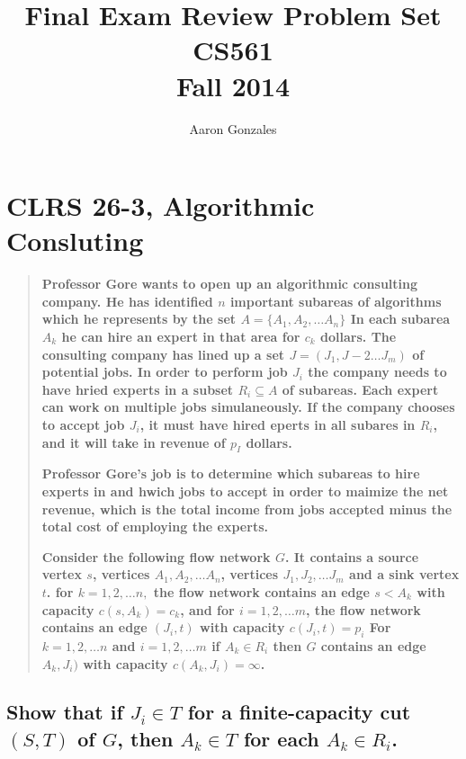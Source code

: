 \documentclass[titlepage]{article}\usepackage[]{graphicx}\usepackage[]{color}
\begin{document}
\title{Final Exam Review Problem Set \\ CS561 \\ Fall 2014}
\author{Aaron Gonzales}
\maketitle


\section{CLRS 26-3, Algorithmic Consluting}
\begin{quote}
  \textbf{Professor Gore wants to open up an algorithmic consulting company.
    He has identified $n$ important subareas of algorithms which he represents
    by the set $A = \{ A_1, A_2,\dots A_n\}$ In each subarea $A_k$ he can hire
    an expert in that area for $c_k$ dollars. The consulting company has lined
    up a set $J = (J_1, J-2 \dots J_m)$ of potential jobs. In order to perform
    job $J_i$ the company needs to have hried experts in a subset $R_i \subseteq A$
    of subareas. Each expert can work on multiple jobs simulaneously. If the
    company chooses to accept job $J_i$, it must have hired eperts in all
  subares in $R_i$, and it will take in revenue of $p_I$ dollars.} 

  \textbf{Professor Gore's job is to determine which subareas to hire experts in and
    hwich jobs to accept in order to maimize the net revenue, which is the
    total income from jobs accepted minus the total cost of employing the
  experts.}

  \textbf{Consider the following flow network $G$. It contains a source vertex $s$,
    vertices $A_1, A_2,\dots A_n$, vertices $J_1, J_2, \dots J_m$ and a sink
    vertex $t$. for $k = 1,2,\dots n,$ the flow network contains an edge
    $s<A_k$ with capacity $c(s,A_k) = c_k$,  and for $i = 1,2, \dots m$, the
    flow network contains an edge $(J_i, t)$ with capacity $c(J_i, t) = p_i$
    For $k = 1,2, \dots n$ and $i = 1,2, \dots m$ if $A_k \in R_i$ then $G$
  contains an edge $A_k, J_i)$ with capacity $c(A_k, J_i) = \infty$. }
\end{quote}

\subsection{ Show that if $J_i \in T$ for a finite-capacity cut $(S,T)$ of
$G$, then $A_k \in T$ for each $A_k \in R_i$.}
\newpage
\end{document}
